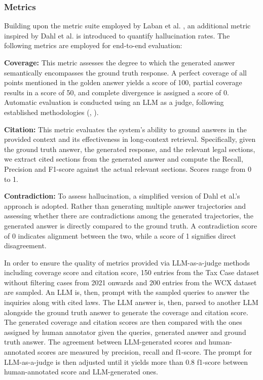 \subsubsection{Metrics}
\label{subsubsec:e2e_metrics}

Building upon the metric suite employed by Laban et al. \cite{laban2024summaryhaystackchallengelongcontext}, an additional metric inspired by Dahl et al. \cite{Dahl_2024} is introduced to quantify hallucination rates. The following metrics are employed for end-to-end evaluation:

\textbf{Coverage: } This metric assesses the degree to which the generated answer semantically encompasses the ground truth response. A perfect coverage of all points mentioned in the golden answer yields a score of 100, partial coverage results in a score of 50, and complete divergence is assigned a score of 0. Automatic evaluation is conducted using an LLM as a judge, following established methodologies (\cite{phan2024ragvslongcontext}, \cite{es2023ragasautomatedevaluationretrieval}).

\textbf{Citation: } This metric evaluates the system’s ability to ground answers in the provided context and its effectiveness in long-context retrieval. Specifically, given the ground truth answer, the generated response, and the relevant legal sections, we extract cited sections from the generated answer and compute the Recall, Precision and F1-score against the actual relevant sections. Scores range from 0 to 1.

\textbf{Contradiction: } To assess hallucination, a simplified version of Dahl et al.'s \cite{Dahl_2024} approach is adopted. Rather than generating multiple answer trajectories and assessing whether there are contradictions among the generated trajectories, the generated answer is directly compared to the ground truth. A contradiction score of 0 indicates alignment between the two, while a score of 1 signifies direct disagreement.

In order to ensure the quality of metrics provided via LLM-as-a-judge methods including coverage score and citation score, 150 entries from the Tax Case dataset without filtering cases from 2021 onwards and 200 entries from the WCX dataset are sampled. An LLM is, then, prompt with the sampled queries to answer the inquiries along with cited laws. The LLM answer is, then, parsed to another LLM alongside the ground truth answer to generate the coverage and citation score. The generated coverage and citation scores are then compared with the ones assigned by human annotator given the queries, generated answer and ground truth answer. The agreement between LLM-generated scores and human-annotated scores are measured by precision, recall and f1-score. The prompt for LLM-as-a-judge is then adjusted until it yields more than 0.8 f1-score between human-annotated score and LLM-generated ones.

